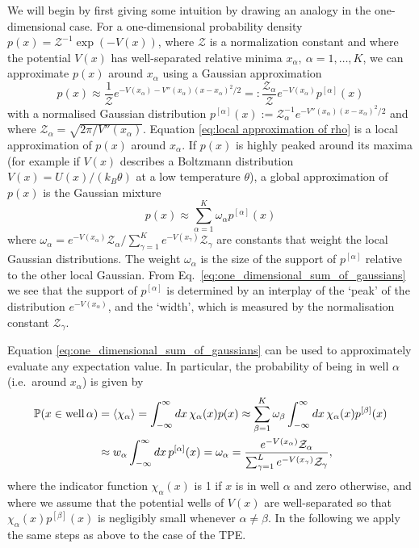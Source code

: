 We will begin by first giving some intuition by drawing an analogy in the one-dimensional case. For a one-dimensional probability density $p(x)=\mathcal{Z}^{-1}\exp(-V(x))$,
where $\mathcal{Z}$ is a normalization constant and where the potential
$V(x)$ has well-separated relative minima $x_{\alpha},\ \alpha=1,\dots,K$,
we can approximate $p(x)$ around $x_{\alpha}$ using a Gaussian
approximation
\begin{equation}
p(x)\approx\frac{1}{\mathcal{{Z}}}e^{-V(x_{\alpha})-V''(x_{\alpha})(x-x_{\alpha})^{2}/2}=:\frac{{{\mathcal{Z}}_{\alpha}}}{\mathcal{{Z}}}e^{-V(x_{\alpha})}p^{[\alpha]}(x)\label{eq:local approximation of rho}
\end{equation}
with a normalised Gaussian distribution $p^{[\alpha]}(x):=\mathcal{Z}_{\alpha}^{-1}e^{-V''(x_{\alpha})(x-x_{\alpha})^{2}/2}$
and where $\mathcal{Z}_{\alpha}=\sqrt{2\pi/V''(x_{\alpha})}$. Equation
\ref{eq:local approximation of rho} is a local approximation of $p(x)$
around $x_{\alpha}$. If $p(x)$ is highly peaked around its maxima
(for example if $V(x)$ describes a Boltzmann distribution $V(x)=U(x)/(k_{B}\theta)$
at a low temperature $\theta$), a global approximation of $p(x)$
is the Gaussian mixture
\begin{equation} 
p(x)\approx \sum_{\alpha=1}^{K}\omega_{\alpha}p^{[\alpha]}(x)\label{eq:one_dimensional_sum_of_gaussians}
\end{equation}
where $\omega_{\alpha}=e^{-V(x_{\alpha})}\mathcal{Z}_{\alpha}/ \sum_{\gamma=1}^{K}e^{-V(x_{\gamma})}\mathcal{Z}_{\gamma}$ are constants that weight the local Gaussian distributions. The weight $\omega_\alpha$ is the size of the support of $p^{[\alpha]}$ relative to the other local Gaussian. From Eq.~\ref{eq:one_dimensional_sum_of_gaussians} we see that the support of $p^{[\alpha]}$ is determined by an interplay of the `peak' of the distribution $e^{-V(x_{\alpha})}$, and the `width', which is measured by the normalisation constant $\mathcal{Z}_{\gamma}$.

Equation \ref{eq:one_dimensional_sum_of_gaussians} can be used
to approximately evaluate any expectation value. In particular, the
probability of being in well $\alpha$ (i.e.~around $x_{\alpha}$)
is given by
\begin{align}
\mathbb{P}(x\in\text{{well\,}}\alpha) & = \langle \chi_{\alpha} \rangle =\int_{-\infty}^{\infty}dx\,\chi_{\alpha}(x)p(x)\approx\sum_{\beta=1}^{K}\omega_{\beta}\int_{-\infty}^{\infty}dx\,\chi_{\alpha}(x)p^{[\beta]}(x)\\
 & \approx w_{\alpha}\int_{-\infty}^{\infty}dx\,p^{[\alpha]}(x)=\omega_{\alpha}=\frac{{e^{-V(x_{\alpha})}\mathcal{Z}_{\alpha}}}{\sum_{\gamma=1}^{L}e^{-V(x_{\gamma})}\mathcal{Z}_{\gamma}},\label{eq:one_dimensional_well_probability}
\end{align}
where the indicator function $\chi_{\alpha}(x)$ is 1 if $x$ is in
well $\alpha$ and zero otherwise, and where we assume that the potential
wells of $V(x)$ are well-separated so that $\chi_{\alpha}(x)p^{[\beta]}(x)$
is negligibly small whenever $\alpha\neq\beta$. In the following we apply the same steps as above to the case of the TPE. 

